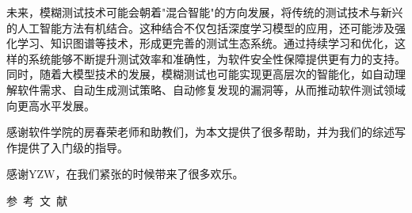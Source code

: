 \documentclass[10.5pt,compsoc]{CjC}
\theoremstyle{mystyle}
\begin{document}
未来，模糊测试技术可能会朝着"混合智能"的方向发展，将传统的测试技术与新兴的人工智能方法有机结合。这种结合不仅包括深度学习模型的应用，还可能涉及强化学习、知识图谱等技术，形成更完善的测试生态系统。通过持续学习和优化，这样的系统能够不断提升测试效率和准确性，为软件安全性保障提供更有力的支持。同时，随着大模型技术的发展，模糊测试也可能实现更高层次的智能化，如自动理解软件需求、自动生成测试策略、自动修复发现的漏洞等，从而推动软件测试领域向更高水平发展。

\begin{strip}
\end{strip}

\vspace {3mm}
感谢软件学院的房春荣老师和助教们，为本文提供了很多帮助，并为我们的综述写作提供了入门级的指导。

感谢YZW，在我们紧张的时候带来了很多欢乐。

\vspace {5mm}
\centerline
{
\heiti 参~考~文~献 }
\end{document}
